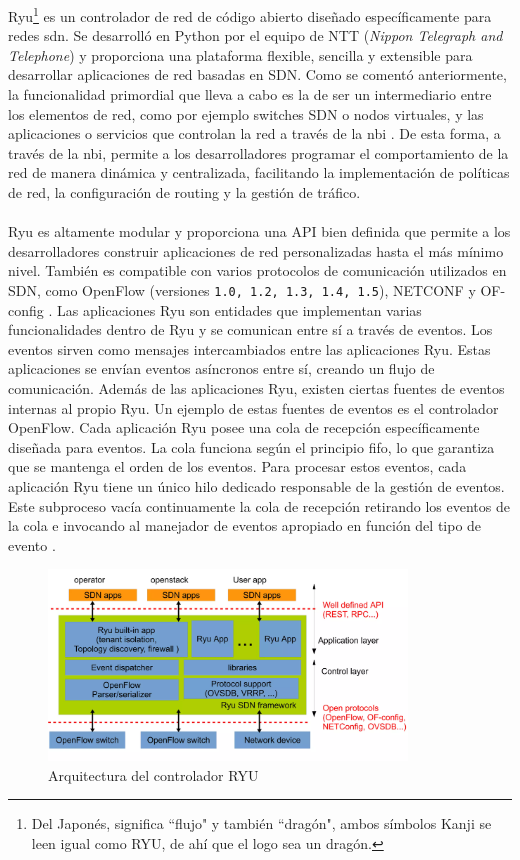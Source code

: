 Ryu\footnote{Del Japonés, significa ``flujo" y también ``dragón", ambos símbolos Kanji se leen igual como RYU, de ahí que el logo sea un dragón.} es un controlador de red de código abierto diseñado específicamente para redes \gls{sdn}. Se desarrolló en Python por el equipo de NTT (\textit{Nippon Telegraph and Telephone}) y proporciona una plataforma flexible, sencilla y extensible para desarrollar aplicaciones de red basadas en SDN. Como se comentó anteriormente, la funcionalidad primordial que lleva a cabo es la de ser un intermediario entre los elementos de red, como por ejemplo switches SDN o nodos virtuales, y las aplicaciones o servicios que controlan la red a través de la \gls{nbi} \cite{tomonori2013introduction}. De esta forma, a través de la \gls{nbi}, permite a los desarrolladores programar el comportamiento de la red de manera dinámica y centralizada, facilitando la implementación de políticas de red, la configuración de routing y la gestión de tráfico.\\
\\
Ryu es altamente modular y proporciona una API bien definida que permite a los desarrolladores construir aplicaciones de red personalizadas hasta el más mínimo nivel. También es compatible con varios protocolos de comunicación utilizados en SDN, como OpenFlow (versiones \texttt{1.0, 1.2, 1.3, 1.4, 1.5}), NETCONF y OF-config \cite{tomonori2013introduction}.  Las aplicaciones Ryu son entidades que implementan varias funcionalidades dentro de Ryu y se comunican entre sí a través de eventos. Los eventos sirven como mensajes intercambiados entre las aplicaciones Ryu. Estas aplicaciones se envían eventos asíncronos entre sí, creando un flujo de comunicación. Además de las aplicaciones Ryu, existen ciertas fuentes de eventos internas al propio Ryu. Un ejemplo de estas fuentes de eventos es el controlador OpenFlow. Cada aplicación Ryu posee una cola de recepción específicamente diseñada para eventos. La cola funciona según el principio \gls{fifo}, lo que garantiza que se mantenga el orden de los eventos. Para procesar estos eventos, cada aplicación Ryu tiene un único hilo dedicado responsable de la gestión de eventos. Este subproceso vacía continuamente la cola de recepción retirando los eventos de la cola e invocando al manejador de eventos apropiado en función del tipo de evento \cite{ryu1}.

\begin{figure}[ht]
    \centering
    \includegraphics[width=0.85\textwidth]{archivos/img/teoria/ryu.png}
    \caption{Arquitectura del controlador  RYU \cite{ryu2}}
    \label{fig:ryu}
\end{figure}

